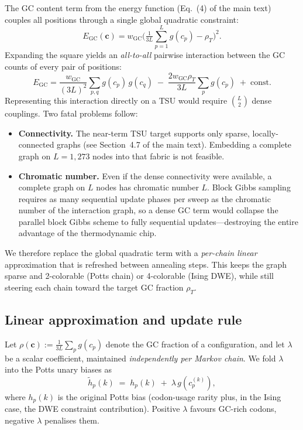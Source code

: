 \documentclass[11pt]{article}
\begin{document}
The GC content term from the energy function (Eq.~(4) of the main text) couples all positions through a single global quadratic constraint:
\begin{equation}\label{eq:gc-term-supp}
  E_{\mathrm{GC}}(\mathbf c) = w_{\mathrm{GC}} \Big( \tfrac{1}{3L} \textstyle\sum_{p=1}^{L} g(c_p) - \rho_T \Big)^{\!2}.
\end{equation}
Expanding the square yields an \emph{all-to-all} pairwise interaction between the GC counts of every pair of positions:
\begin{equation}\label{eq:gc-expanded}
  E_{\mathrm{GC}} = \frac{w_{\mathrm{GC}}}{(3L)^2} \sum_{p,q} g(c_p)\, g(c_q)
  \;-\; \frac{2 w_{\mathrm{GC}} \rho_T}{3L} \sum_p g(c_p)
  \;+\; \mathrm{const}.
\end{equation}
Representing this interaction directly on a TSU would require $\binom{L}{2}$ dense couplings.
Two fatal problems follow:
\begin{itemize}
  \item \textbf{Connectivity.}
    The near-term TSU target supports only sparse, locally-connected graphs (see Section~4.7 of the main text).
    Embedding a complete graph on $L = 1{,}273$ nodes into that fabric is not feasible.
  \item \textbf{Chromatic number.}
    Even if the dense connectivity were available, a complete graph on $L$ nodes has chromatic number $L$.
    Block Gibbs sampling requires as many sequential update phases per sweep as the chromatic number of the interaction graph, so a dense GC term would collapse the parallel block Gibbs scheme to fully sequential updates---destroying the entire advantage of the thermodynamic chip.
\end{itemize}
We therefore replace the global quadratic term with a \emph{per-chain linear} approximation that is refreshed between annealing steps.
This keeps the graph sparse and 2-colorable (Potts chain) or 4-colorable (Ising DWE), while still steering each chain toward the target GC fraction $\rho_T$.

\subsection*{Linear approximation and update rule}

Let $\rho(\mathbf c) \mathrel{:=} \frac{1}{3L} \sum_p g(c_p)$ denote the GC fraction of a configuration, and let $\lambda$ be a scalar coefficient, maintained \emph{independently per Markov chain}.
We fold $\lambda$ into the Potts unary biases as
\begin{equation}\label{eq:lambda-bias}
  \tilde h_p(k) \;=\; h_p(k) \;+\; \lambda \, g\!\left(c_p^{(k)}\right),
\end{equation}
where $h_p(k)$ is the original Potts bias (codon-usage rarity plus, in the Ising case, the DWE constraint contribution).
Positive $\lambda$ favours GC-rich codons, negative $\lambda$ penalises them.
\end{document}
